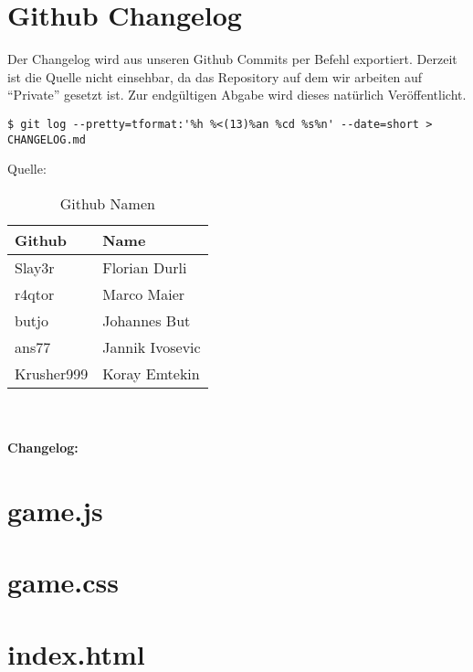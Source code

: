 \documentclass[
	12pt,
	a4paper,
	bibtotoc,
	cleardoubleempty, 
	idxtotoc,
	ngerman,
	openright
	final,
	listof=nochaptergap,
	]{scrbook}
\begin{document}
\section{Github Changelog}
Der Changelog wird aus unseren Github Commits per Befehl exportiert. Derzeit ist die Quelle nicht einsehbar, da das Repository auf dem wir arbeiten auf ``Private'' gesetzt ist. Zur endgültigen Abgabe wird dieses natürlich Veröffentlicht.
\lstset{language=bash}
\begin{lstlisting}[frame=single]
$ git log --pretty=tformat:'%h %<(13)%an %cd %s%n' --date=short > CHANGELOG.md
\end{lstlisting}
Quelle: \cite{changelog}
\begin{table}[h]
	\centering
	\begin{tabular}{|l|l|}
		\toprule
		\textbf{Github}& \textbf{Name}\\
		\midrule
		Slay3r & Florian Durli 	\\ 
		r4qtor & Marco Maier	\\
		butjo  & Johannes But	\\ 
		ans77  & Jannik Ivosevic\\
		Krusher999 & Koray Emtekin\\
		\bottomrule
	\end{tabular}
	\caption{Github Namen}
\end{table}
\\\\
\textbf{Changelog: }

\section{game.js}

\section{game.css}

\section{index.html}

\end{document}
